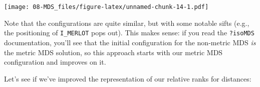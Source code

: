 \documentclass[
]{book}
\newenvironment{Shaded}{\begin{snugshade}}{\end{snugshade}}
\newcommand{\AttributeTok}[1]{\textcolor[rgb]{0.13,0.29,0.53}{#1}}
\newcommand{\ConstantTok}[1]{\textcolor[rgb]{0.56,0.35,0.01}{#1}}
\newcommand{\FunctionTok}[1]{\textcolor[rgb]{0.13,0.29,0.53}{\textbf{#1}}}
\newcommand{\NormalTok}[1]{#1}
\newcommand{\OtherTok}[1]{\textcolor[rgb]{0.56,0.35,0.01}{#1}}
\newcommand{\SpecialCharTok}[1]{\textcolor[rgb]{0.81,0.36,0.00}{\textbf{#1}}}
\newcommand{\StringTok}[1]{\textcolor[rgb]{0.31,0.60,0.02}{#1}}
\begin{document}
\texttt{[image: 08-MDS\_files/figure-latex/unnamed-chunk-14-1.pdf]}

Note that the configurations are quite similar, but with some notable sifts (e.g., the positioning of \texttt{I\_MERLOT} pops out). This makes sense: if you read the \texttt{?isoMDS} documentation, you'll see that the initial configuration for the non-metric MDS \emph{is} the metric MDS solution, so this approach starts with our metric MDS configuration and improves on it.

Let's see if we've improved the representation of our relative ranks for distances:

\begin{Shaded}
\end{Shaded}
\end{document}
